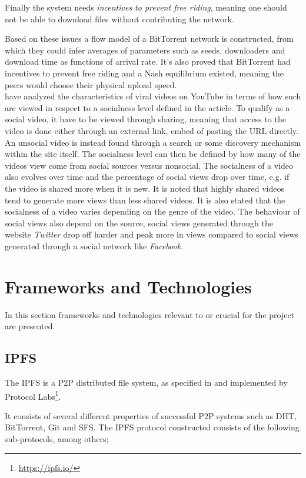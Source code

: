 Finally the system needs \emph{incentives to prevent free riding}, meaning one should not be able to download files without contributing the network.

Based on these issues a flow model of a BitTorrent network is constructed, from which they could infer averages of parameters such as seeds, downloaders and download time as functions of arrival rate. It's also proved that BitTorrent had incentives to prevent free riding and a Nash equilibrium existed, meaning the peers would choose their physical upload speed.
\\


\citet{broxton2013catching} have analyzed the characteristics of viral videos on YouTube in terms of how such are viewed in respect to a socialness level defined in the article. To qualify as a social video, it have to be viewed through sharing, meaning that access to the video is done either through an external link, embed of pasting the URL directly. An unsocial video is instead found through a search or some discovery mechanism within the site itself. The socialness level can then be defined by how many of the videos view come from social sources versus nonsocial. The socialness of a video also evolves over time and the percentage of social views drop over time, e.g. if the video is shared more when it is new. It is noted that highly shared videos tend to generate more views than less shared videos. It is also stated that the socialness of a video varies depending on the genre of the video. The behaviour of social views also depend on the source, social views generated through the website \textit{Twitter} drop off harder and peak more in views compared to social views generated through a social network like \textit{Facebook}.


\section{Frameworks and Technologies}
\label{sec:fram-techn}
In this section frameworks and technologies relevant to or crucial for the project are presented.

\subsection{\acl{IPFS}}
The \ac{IPFS} is a \ac{P2P} distributed file system, as specified in \citet{benet2014ipfs} and implemented by Protocol Labs\footnote{\url{https://ipfs.io/}}.

It consists of several different properties of successful \ac{P2P} systems such as \ac{DHT}, BitTorrent, Git and \ac{SFS}. The \ac{IPFS} protocol constructed consists of the following sub-protocols, among others;

